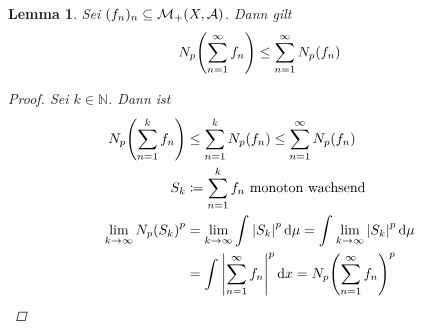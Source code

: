 \documentclass[11pt, twoside, a4paper]{article}
\theoremstyle{plain}
\newtheorem{lemma}[blockelement]{Lemma}
\numberwithin{equation}{subsection}
\newcommand{\of}[1]{\mathopen{}\mathclose{}\bgroup\left(#1\aftergroup\egroup\right)}
\newcommand{\abs}[1]{\left\lvert#1\right\rvert}
\newcommand{\dif}{\mathop{}\!\mathrm{d}}
\newcommand{\toinf}{\to\infty}
\newcommand{\N}{\mathbb{N}}
\newcommand{\mA}{\mathcal{A}}
\newcommand{\mM}{\mathcal{M}}
\begin{document}
    \begin{lemma} %
        Sei $(f_n)_n \subseteq \mM_+\of{X, \mA}$. Dann gilt
        \begin{align*}
            N_p\of{ \sum_{n=1}^{\infty} f_n} \leq \sum_{n=1}^{\infty} N_p\of{f_n}
        \end{align*}

        \begin{proof}
            Sei $k\in\N$. Dann ist
            \begin{align*}
                N_p\of{ \sum_{n=1}^{k} f_n} &\leq \sum_{n=1}^{k} N_p\of{f_n} \leq \sum_{n=1}^{\infty} N_p\of{f_n}\\
                S_k &\coloneqq \sum_{n=1}^{k} f_n \text{ monoton wachsend}\\
                \lim_{k\toinf} N_p\of{S_k}^p &= \lim_{k\toinf}  \int_{}^{} \abs{S_k}^p \dif \mu = \int_{}^{} \lim_{k\toinf} \abs{S_k}^p \dif \mu\\
                &= \int_{}^{} \abs{ \sum_{n=1}^{\infty} f_n}^p \dif x = N_p\of{ \sum_{n=1}^{\infty} f_n}^p \qedhere
            \end{align*}
        \end{proof}
    \end{lemma}
\end{document}
